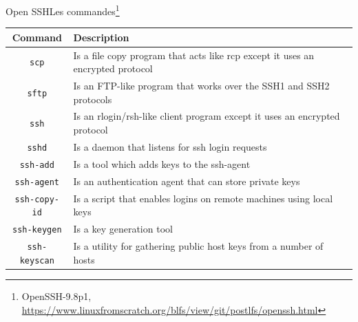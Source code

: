 \documentclass{beamer}
\begin{document}
    \begin{frame}{Open SSH}{Les commandes\footnote{OpenSSH-9.8p1, \url{https://www.linuxfromscratch.org/blfs/view/git/postlfs/openssh.html}}}
        \begin{footnotesize}
            \begin{table}[h!]
                \centering
                \begin{tabular}{|c|p{8cm}|}
                    \hline
                    \textbf{Command}        & \textbf{Description}                                                           \\
                    \hline
                    \lstinline{scp}         & Is a file copy program that acts like rcp except it uses an encrypted protocol \\
                    \hline
                    \lstinline{sftp}        & Is an FTP-like program that works over the SSH1 and SSH2 protocols             \\
                    \hline
                    \lstinline{ssh}         & Is an rlogin/rsh-like client program except it uses an encrypted protocol      \\
                    \hline
                    \lstinline{sshd}        & Is a daemon that listens for ssh login requests                                \\
                    \hline
                    \lstinline{ssh-add}     & Is a tool which adds keys to the ssh-agent                                     \\
                    \hline
                    \lstinline{ssh-agent}   & Is an authentication agent that can store private keys                         \\
                    \hline
                    \lstinline{ssh-copy-id} & Is a script that enables logins on remote machines using local keys            \\
                    \hline
                    \lstinline{ssh-keygen}  & Is a key generation tool                                                       \\
                    \hline
                    \lstinline{ssh-keyscan} & Is a utility for gathering public host keys from a number of hosts             \\
                    \hline
                \end{tabular}
            \end{table}
        \end{footnotesize}
    \end{frame}
\end{document}
